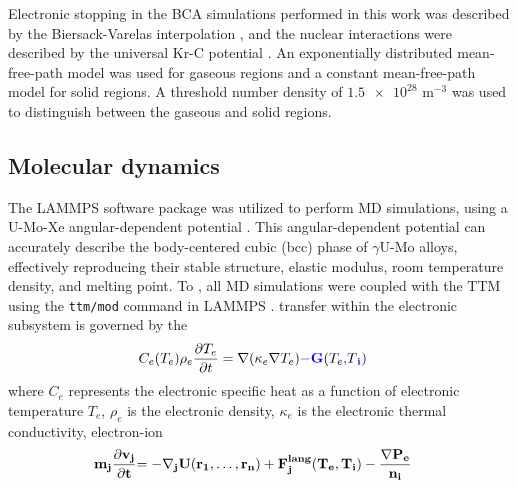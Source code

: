 \documentclass[review]{elsarticle}
\providecommand{\DIFadd}[1]{{\bf #1}} %
\providecommand{\DIFdel}[1]{} %
\providecommand{\DIFaddbegin}{\protect\color{blue}} %
\providecommand{\DIFaddend}{\protect\color{black}} %
\providecommand{\DIFdelbegin}{\protect\color{red}} %
\providecommand{\DIFdelend}{\protect\color{black}} %
\newcommand{\DIFscaledelfig}{0.5}
\newlength{\DIFdelgraphicswidth} %
\newlength{\DIFdelgraphicsheight} %
\newcommand{\DIFaddincludegraphics}[2][]{{\color{blue}\fbox{\DIFOincludegraphics[#1]{#2}}}} %
\newcommand{\DIFdelincludegraphics}[2][]{%
\sbox{\DIFdelgraphicsbox}{\DIFOincludegraphics[#1]{#2}}%
\settoboxwidth{\DIFdelgraphicswidth}{\DIFdelgraphicsbox} %
\settoboxtotalheight{\DIFdelgraphicsheight}{\DIFdelgraphicsbox} %
\scalebox{\DIFscaledelfig}{%
\parbox[b]{\DIFdelgraphicswidth}{\usebox{\DIFdelgraphicsbox}\\[-\baselineskip] \rule{\DIFdelgraphicswidth}{0em}}\llap{\resizebox{\DIFdelgraphicswidth}{\DIFdelgraphicsheight}{%
\setlength{\unitlength}{\DIFdelgraphicswidth}%
\begin{picture}(1,1)%
\thicklines\linethickness{2pt} %
{\color[rgb]{1,0,0}\put(0,0){\framebox(1,1){}}}%
{\color[rgb]{1,0,0}\put(0,0){\line( 1,1){1}}}%
{\color[rgb]{1,0,0}\put(0,1){\line(1,-1){1}}}%
\end{picture}%
}\hspace*{3pt}}} %
} %
\DeclareRobustCommand{\DIFaddbegin}{\DIFOaddbegin \let\includegraphics\DIFaddincludegraphics} %
\DeclareRobustCommand{\DIFaddend}{\DIFOaddend \let\includegraphics\DIFOincludegraphics} %
\DeclareRobustCommand{\DIFdelbegin}{\DIFOdelbegin \let\includegraphics\DIFdelincludegraphics} %
\DeclareRobustCommand{\DIFdelend}{\DIFOaddend \let\includegraphics\DIFOincludegraphics} %
\begin{document}
Electronic stopping in the BCA simulations performed in this work was described by the Biersack-Varelas interpolation \cite{varelas1970}, and the nuclear interactions were described by the universal Kr-C potential \cite{moller1984, eckstein2013}. An exponentially distributed mean-free-path model was used for gaseous regions and a constant mean-free-path model for solid regions. A threshold number density of $\num{1.5e28}$ m$^{-3}$ was used to distinguish between the gaseous and solid regions.

\subsection{Molecular dynamics}

The LAMMPS software package \cite{lammps} was utilized to perform MD simulations, using a U-Mo-Xe angular-dependent potential \cite{smirnova2013, starikov2018, beelerADP}. This angular-dependent potential can accurately describe the body-centered cubic (bcc) phase of $\gamma$U-Mo alloys, effectively reproducing their stable structure, elastic modulus, room temperature density, and melting point. To \DIFdelbegin \DIFdel{emulate the electronic stopping of the FFs}\DIFdelend \DIFaddbegin \DIFadd{handle energy transfer through and between electronic and ionic subsystems}\DIFaddend , all MD simulations were coupled with the TTM using the \texttt{ttm/mod} command in LAMMPS \cite{norman2013, pisarev2014}. \DIFdelbegin \DIFdel{This approach treats the electronic subsystem as a continuum while describing the ionic subsystem through standard MD. Energy }\DIFdelend \DIFaddbegin \DIFadd{In this model, energy }\DIFaddend transfer within the electronic subsystem is governed by the \DIFdelbegin \DIFdel{heat diffusion equation, which includes source terms to model the heat transfer between the electronic and ionic subsystems:
}\DIFdelend \DIFaddbegin \DIFadd{thermal conductivity equation:
}\DIFaddend \begin{align}
	C_e (T_e) \rho_e \frac{\partial T_e}{\partial t}
		&= \nabla (\kappa_e \nabla T_e) \DIFdelbegin \DIFdel{+ g_p }\DIFdelend \DIFaddbegin \DIFadd{- G }\DIFaddend (T_e\DIFdelbegin \DIFdel{- }\DIFdelend \DIFaddbegin \DIFadd{, }\DIFaddend T\DIFdelbegin \DIFdel{_a}\DIFdelend \DIFaddbegin \DIFadd{_i}\DIFaddend )
	\DIFaddbegin \label{eq:Ce}
\DIFaddend \end{align}
where $C_e$ represents the electronic specific heat as a function of electronic temperature $T_e$, $\rho_e$ is the electronic density, $\kappa_e$ is the electronic thermal conductivity, \DIFdelbegin \DIFdel{$g_p$ is the coupling constant for }\DIFdelend \DIFaddbegin \DIFadd{$G (T_e, T_i)$ is the source term that corresponds to the energy transfer between the electronic and ionic subsystems, and $T_i$ is the effective local ionic temperature. The equations of motion for the ions are modified to account for the }\DIFaddend electron-ion \DIFdelbegin \DIFdel{interactions, and $T_a$ is the ionic temperature \cite{duffy2006, rutherford2007}. }\DIFdelend \DIFaddbegin \DIFadd{energy exchange:
}\begin{align}
	\DIFadd{m_j \frac{\partial v_j}{\partial t}
		}&\DIFadd{= - \nabla_j U (r_1, \ldots, r_n)
		+ F_j^{lang} (T_e, T_i) - \frac{\nabla P_e}{n_i}
}\end{align}
\end{document}
